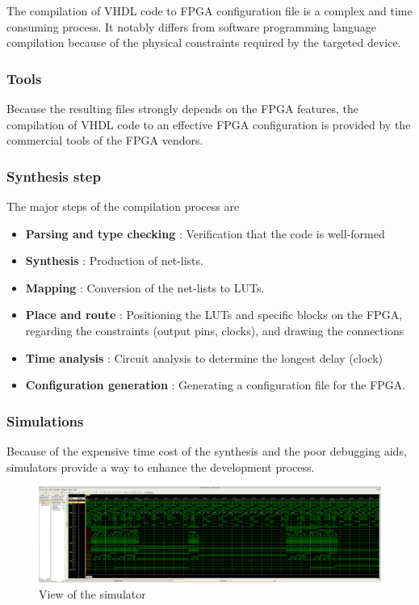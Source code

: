 \documentclass[10pt,a4paper]{article}
\begin{document}
The compilation of VHDL code to FPGA configuration file is a complex and time consuming process. It notably differs from software programming language compilation because of the physical constraints required by the targeted device.

\subsubsection{Tools}

Because the resulting files strongly depends on the FPGA features, the compilation of VHDL code to an effective FPGA configuration is provided by the commercial tools of the FPGA vendors.


\subsubsection{Synthesis step}

The major steps of the compilation process are

\begin{itemize}
	\item \textbf{Parsing and type checking} : Verification that the code is well-formed
	\item \textbf{Synthesis} : Production of net-lists.
	\item \textbf{Mapping} : Conversion of the net-lists to LUTs.
	\item \textbf{Place and route} : Positioning the LUTs and specific blocks on the FPGA, regarding the constraints (output pins, clocks), and drawing the connections
	\item \textbf{Time analysis} : Circuit analysis to determine the longest delay (clock)
	\item \textbf{Configuration generation} : Generating a configuration file for the FPGA.
\end{itemize}

\subsubsection{Simulations}

Because of the expensive time cost of the synthesis and the poor debugging aids, simulators provide a way to enhance the development process.

\begin{figure}[h]
	\includegraphics[scale=0.12]{Debug.png}
	\caption{View of the simulator}
\end{figure}
\end{document}

